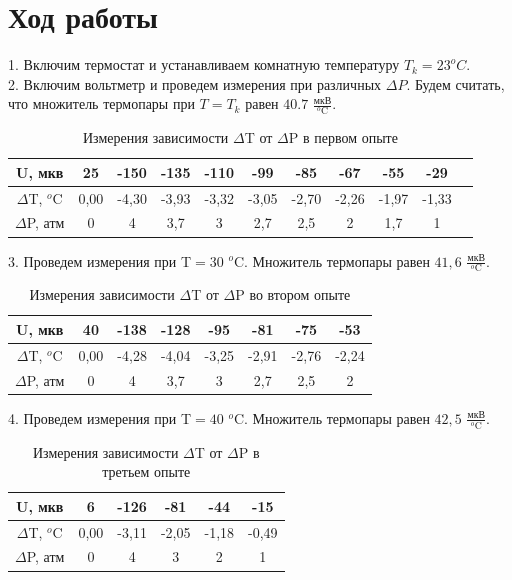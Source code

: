 \documentclass[a4paper]{article}
\begin{document}
	\section{Ход работы}
	1. Включим термостат и устанавливаем комнатную температуру ${T_k}=23^o C$. \\
	2. Включим вольтметр и проведем измерения при различных $\Delta P$. Будем считать, что множитель термопары при ${T=T_k}$ равен $40.7$  $\frac{\text{мкВ}}{^o \text{C}}$. \\
	\begin{table}[h!]
 		\centering
	\begin{tabular}{|c|c|c|c|c|c|c|c|c|c|c|}
	\hline
U, мкв & 25	& -150 &	-135&	 -110&	-99&	-85&	-67&	-55&	-29 \\
\hline
$\Delta$T, $^o$C& 0,00	& -4,30	&-3,93	&-3,32	&-3,05	&-2,70 &	-2,26	& -1,97&	-1,33
 \\
\hline
$\Delta$P, атм& 0&	4&	3,7&	3&	2,7&	2,5&	2&	1,7&	1 \\
\hline
    	\end{tabular}
  		\caption{Измерения зависимости $\Delta$T от $\Delta$P в первом опыте}
	\end{table}
	3. Проведем измерения при T$=30$ $^o$C. Множитель термопары равен $41,6$ $\frac{\text{мкВ}}{^o \text{C}}$. \\
	\begin{table}[h!]
 		\centering
	\begin{tabular}{|c|c|c|c|c|c|c|c|}
	\hline
U, мкв & 40&	-138 &	-128	&-95	&-81&	-75	&-53
 \\
\hline
$\Delta$T, $^o$C& 0,00&	-4,28&	-4,04&	-3,25&	-2,91&	-2,76&	-2,24
  \\
\hline
$\Delta$P, атм& 0&	4&	3,7&	3&	2,7&	2,5	& 2\\
\hline
    	\end{tabular}
  		\caption{Измерения зависимости $\Delta$T от $\Delta$P во втором опыте	}
	\end{table}
	4. Проведем измерения при T$=40$ $^o$C. Множитель термопары равен $42,5$ $\frac{\text{мкВ}}{^o \text{C}}$. 
	\begin{table}[h!]
 		\centering
	\begin{tabular}{|c|c|c|c|c|c|}
	\hline
U, мкв & 6&	-126&	-81&	-44&	-15
 \\
\hline
$\Delta$T, $^o$C& 0,00	&-3,11&	-2,05&	-1,18&	-0,49

  \\
\hline
$\Delta$P, атм& 0&4&	3& 2 &1\\
\hline
    	\end{tabular}
  		\caption{Измерения зависимости $\Delta$T от $\Delta$P в третьем опыте	}
	\end{table}
\end{document}
